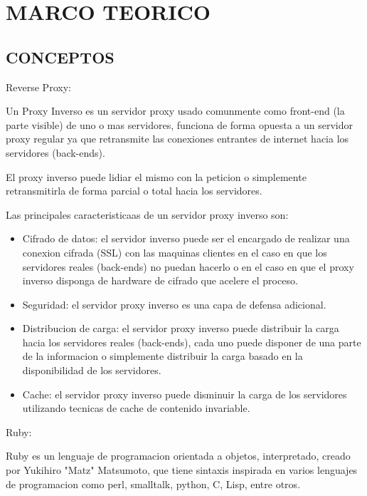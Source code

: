 \section{MARCO TEORICO}

\subsection{CONCEPTOS}

Reverse Proxy:

Un Proxy Inverso es un servidor proxy usado comunmente como front-end (la parte visible) de uno o mas servidores, funciona de forma opuesta a un servidor proxy regular ya que retransmite las conexiones entrantes de internet hacia los servidores (back-ends).

El proxy inverso puede lidiar el mismo con la peticion o simplemente retransmitirla de forma parcial o total hacia los servidores.

Las principales caracteristicaas de un servidor proxy inverso son:

\begin{itemize}
	\item Cifrado de datos: el servidor inverso puede ser el encargado de realizar una conexion cifrada (SSL) con las maquinas clientes en el caso en que los servidores reales (back-ends) no puedan hacerlo o en el caso en que el proxy inverso disponga de hardware de cifrado que acelere el proceso.
	
	\item Seguridad: el servidor proxy inverso es una capa de defensa adicional.
	
	\item Distribucion de carga: el servidor proxy inverso puede distribuir la carga	hacia los servidores reales (back-ends), cada uno puede disponer de una parte de la informacion o simplemente distribuir la carga basado en la disponibilidad de los servidores.
	
	\item Cache: el servidor proxy inverso puede disminuir la carga de los servidores utilizando tecnicas de cache de contenido invariable.
\end{itemize}

Ruby:

Ruby es un lenguaje de programacion orientada a objetos, interpretado, creado por Yukihiro "Matz" Matsumoto, que tiene sintaxis inspirada en varios lenguajes de programacion como perl, smalltalk, python, C, Lisp, entre otros.

